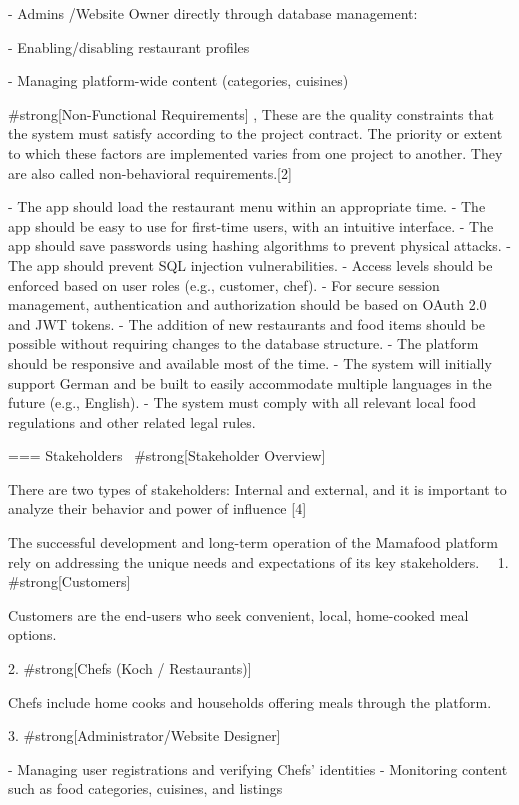   - Admins /Website Owner directly through database management:

    - Enabling/disabling restaurant profiles

    - Managing platform-wide content (categories, cuisines)
\

#strong[Non-Functional Requirements]
,
These are the quality constraints that the system must satisfy according to the project contract. The priority or extent to which these factors are implemented varies from one project to another. They are also called non-behavioral requirements.[2]


    - The app should load the restaurant menu within an appropriate time.
    - The app should be easy to use for first-time users, with an intuitive interface.
    - The app should save passwords using hashing algorithms to prevent physical attacks.
    - The app should prevent SQL injection vulnerabilities.
    - Access levels should be enforced based on user roles (e.g., customer, chef).
    - For secure session management, authentication and authorization should be based on OAuth 2.0 and JWT tokens.
    - The addition of new restaurants and food items should be possible without requiring changes to the database structure.
    - The platform should be responsive and available most of the time.
    - The system will initially support German and be built to easily accommodate multiple languages in the future (e.g., English).
    - The system must comply with all relevant local food regulations and other related legal rules.
\

=== Stakeholders
\
#strong[Stakeholder Overview]

There are two types of stakeholders: Internal and external, and it is important to analyze their behavior and power of influence [4]

The successful development and long-term operation of the Mamafood platform rely on addressing the unique needs and expectations of its key stakeholders. 
\
\
1. #strong[Customers]

  Customers are the end-users who seek convenient, local, home-cooked meal options. 

2. #strong[Chefs (Koch / Restaurants)]

Chefs include home cooks and households offering meals through the platform. 

3. #strong[Administrator/Website Designer]

    - Managing user registrations and verifying Chefs' identities
    - Monitoring content such as food categories, cuisines, and listings

